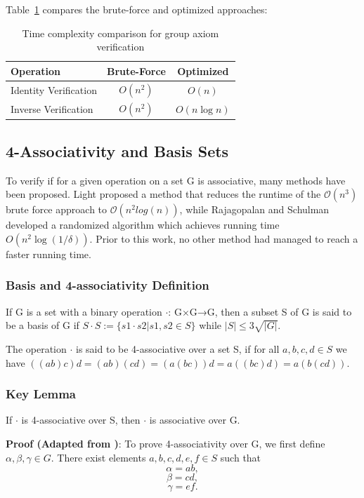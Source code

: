 \documentclass[sigconf]{acmart}
\begin{document}
Table~\ref{tab:complexity} compares the brute-force and optimized approaches:

\begin{table}[h]
\centering
\caption{Time complexity comparison for group axiom verification}
\label{tab:complexity}
\begin{tabular}{lcc}
\hline
Operation & Brute-Force & Optimized \\
\hline
Identity Verification & $O(n^2)$ & $O(n)$ \\
Inverse Verification & $O(n^2)$ & $O(n\log n)$ \\
\hline
\end{tabular}
\end{table}



\subsection{4-Associativity and Basis Sets}
To verify if for a given operation on a set G is associative, many methods have been proposed. Light proposed a method that reduces the runtime of the \(\mathcal{O}(n^3)\) brute force approach to \(\mathcal{O}(n^2log(n))\), while Rajagopalan and Schulman developed a randomized algorithm which achieves running time $O(n^2 \log(1/\delta))$. Prior to this work, no other method had managed to reach a faster running time.

\subsubsection{Basis and 4-associativity Definition}
\begin{definition}
If G is a set with a binary operation \(\cdot\): G×G→G, then a subset S of G is said to be a basis of G if $S\cdot S := \{s1\cdot s2 |s1,s2 \in S\}$ while $|S|\le3\sqrt{|G|}$.
\end{definition}

The operation \(\cdot\) is said to be 4-associative over a set S, if for all $a,b,c,d \in S$ we have $((ab)c)d= (ab)(cd) = (a(bc))d= a((bc)d) = a(b(cd))$.

\subsubsection{Key Lemma}
If \(\cdot\) is 4-associative over S, then \(\cdot\) is associative over G.

\textbf{Proof (Adapted from \cite{10756141})}:
To prove 4-associativity over G, we first define \(\alpha, \beta,\gamma \in G\). There exist elements \(a,b,c,d,e,f \in S\) such that
\[\alpha = ab,\]
\[\beta = cd,\]
\[\gamma = ef.\]
\end{document}

